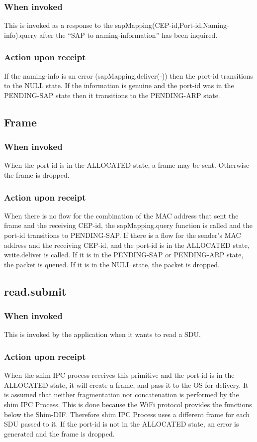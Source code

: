 \subsubsection{When invoked}
This is invoked as a response to the sapMapping(CEP-id,Port-id,Naming-info).query after the ``SAP to naming-information'' has been inquired. 
\subsubsection{Action upon receipt}
If the naming-info is an error (sapMapping.deliver(-)) then the port-id transitions to the NULL state. If the information is genuine and the port-id was in the PENDING-SAP state then it transitions to the PENDING-ARP state. 

\subsection{Frame}
\subsubsection{When invoked}
When the port-id is in the ALLOCATED state, a frame may be sent.  Otherwise the frame is dropped.
\subsubsection{Action upon receipt}
When there is no flow for the combination of the MAC address that sent the frame and the receiving CEP-id, the sapMapping.query function is called and the port-id transitions to PENDING-SAP. If there is a flow for the sender's MAC address and the receiving CEP-id, and the port-id is in the ALLOCATED state, write.deliver is called. If it is in the PENDING-SAP or PENDING-ARP state, the packet is queued. If it is in the NULL state, the packet is dropped.


\subsection{read.submit}
\subsubsection{When invoked}
This is invoked by the application when it wants to read a SDU.
\subsubsection{Action upon receipt}
When the shim IPC process receives this primitive and the port-id is in the ALLOCATED state, it will create a frame, and pass it to the OS for delivery. It is assumed that neither fragmentation nor concatenation is performed by the shim IPC Process. This is done because the WiFi protocol provides the functions below the Shim-DIF. Therefore shim IPC Process uses a different frame for each SDU passed to it. If the port-id is not in the ALLOCATED state, an error is generated and the frame is dropped.


